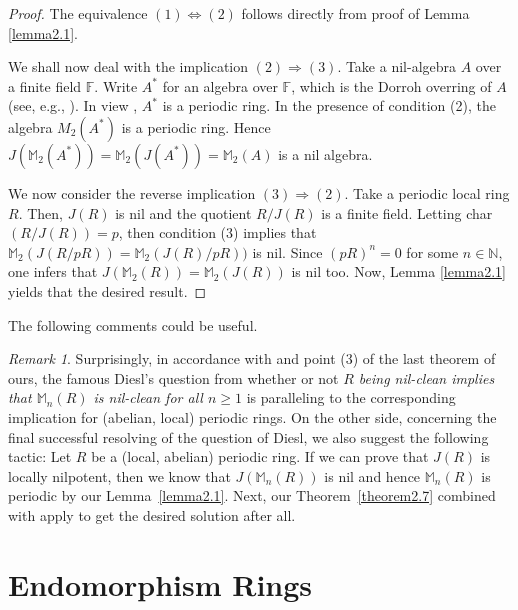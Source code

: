 \documentclass[12pt]{amsart}
\theoremstyle{definition}
\theoremstyle{remark}
\newtheorem{rem}[thm]{Remark}
\numberwithin{equation}{section}
\begin{document}
\begin{proof} The equivalence $(1) \Leftrightarrow (2)$ follows directly from proof of Lemma \ref{lemma2.1}.

We shall now deal with the implication $(2) \Rightarrow (3)$. Take a nil-algebra $A$ over a finite field $\mathbb{F}$. Write $A^*$ for an algebra over $\mathbb{F}$, which is the Dorroh overring of $A$ (see, e.g., \cite{D13}). In view \cite[Theorem 3.4]{CD}, $A^*$ is a periodic ring. In the presence of condition (2), the algebra $M_2(A^*)$ is a periodic ring. Hence $J(\mathbb{M}_2(A^*))=\mathbb{M}_2(J(A^*))=\mathbb{M}_2(A)$ is a nil algebra.

We now consider the reverse implication $(3) \Rightarrow (2)$. Take a periodic local ring $R$. Then, $J(R)$ is nil and the quotient $R/J(R)$ is a finite field. Letting char$(R/J(R))=p$, then condition (3) implies that $\mathbb{M}_2(J(R/pR))=\mathbb{M}_2(J(R)/pR))$ is nil. Since $(pR)^n=0$ for some $n\in \mathbb{N}$, one infers that $J(\mathbb{M}_2(R))=\mathbb{M}_2(J(R))$ is nil too. Now, Lemma \ref{lemma2.1} yields that the desired result.
\end{proof}

The following comments could be useful.

\begin{rem}\label{Dis} Surprisingly, in accordance with \cite[Theorem 3.1]{M} and point (3) of the last theorem of ours, the famous Diesl's question from \cite{D13} whether or not {\it $R$ being nil-clean implies that $\mathbb{M}_n(R)$ is nil-clean for all $n\geq 1$} is paralleling to the corresponding implication for (abelian, local) periodic rings. On the other side, concerning the final successful resolving of the question of Diesl, we also suggest the following tactic: Let $R$ be a (local, abelian) periodic ring. If we can prove that $J(R)$ is locally nilpotent, then we know that $J(\mathbb{M}_n(R))$ is nil and hence $\mathbb{M}_n(R)$ is periodic by our Lemma~\ref{lemma2.1}. Next, our Theorem~\ref{theorem2.7} combined with \cite[Theorem 3.1]{M} apply to get the desired solution after all.
\end{rem}

\section{Endomorphism Rings}\label{SectionEndomorphismRings}

\medskip
\end{document}
